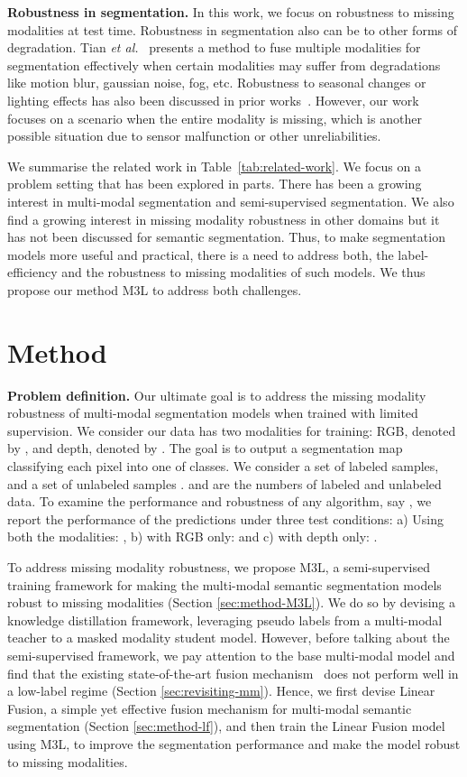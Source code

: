 \documentclass[10pt,twocolumn,letterpaper]{article}
\begin{document}
\noindent\textbf{Robustness in segmentation.} In this work, we focus on robustness to missing modalities at test time. Robustness in segmentation also can be to other forms of degradation. Tian \textit{et al.}~\cite{tian2020uno} presents a method to fuse multiple modalities for segmentation effectively when certain modalities may suffer from degradations like  motion blur, gaussian noise, fog, etc. Robustness to seasonal changes or lighting effects has also been discussed in prior works~\cite{Larsson_2019_CVPR, valada2016towards, 9011192}. However, our work focuses on a scenario when the entire modality is missing, which is another possible situation due to sensor malfunction or other unreliabilities.

We summarise the related work in Table~\ref{tab:related-work}. We focus on a problem setting that has been explored in parts. There has been a growing interest in multi-modal segmentation and semi-supervised segmentation. We also find a growing interest in missing modality robustness in other domains but it has not been discussed for semantic segmentation. Thus, to make segmentation models more useful and practical, there is a need to address both, the label-efficiency and the robustness to missing modalities of such models. We thus propose our method M3L to address both challenges.
 \section{Method}


\noindent\textbf{Problem definition.} Our ultimate goal is to address the missing modality robustness of multi-modal segmentation models when trained with limited supervision. We consider our data has two modalities for training: RGB, denoted by , and depth, denoted by . The goal is to output a segmentation map classifying each pixel into one of  classes.  We consider a set of labeled samples,  and a set of unlabeled samples .  and  are the numbers of labeled and unlabeled data.
To examine the performance and robustness of any algorithm, say , we report the performance  of the predictions under three test conditions: a) Using both the modalities: , b) with RGB only:  and c) with depth only: 
.

To address missing modality robustness, we propose M3L, a semi-supervised training framework for making the multi-modal semantic segmentation models robust to missing modalities (Section \ref{sec:method-M3L}). We do so by devising a knowledge distillation framework, leveraging pseudo labels from a multi-modal teacher to a masked modality student model. However, before talking about the semi-supervised framework, we pay attention to the base multi-modal model and find that the existing state-of-the-art fusion mechanism~\cite{tokenfusion} does not perform well in a low-label regime (Section \ref{sec:revisiting-mm}). Hence, we first devise Linear Fusion, a simple yet effective fusion mechanism for multi-modal semantic segmentation (Section \ref{sec:method-lf}), and then train the Linear Fusion model using M3L, to improve the segmentation performance and make the model robust to missing modalities.
\end{document}
